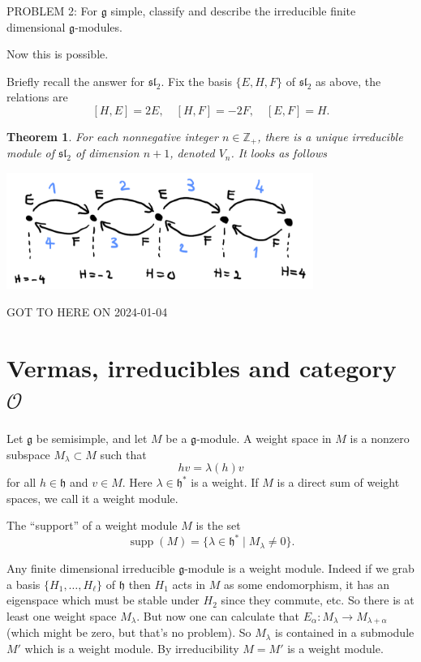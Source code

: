 \documentclass[12pt]{article}
\theoremstyle{plain}
\newtheorem{thm}{Theorem}[section]
\theoremstyle{definition}
\numberwithin{equation}{section}
\DeclareMathOperator{\supp}{supp}
\newcommand{\al}{\alpha}
\newcommand{\la}{\lambda}
\newcommand{\Z}{\mathbb{Z}}
\newcommand{\g}{\mathfrak{g}}
\newcommand{\h}{\mathfrak{h}}
\newcommand{\sll}{\mathfrak{sl}}
\newcommand{\OO}{\mathcal{O}}
\begin{document}
PROBLEM 2: For $\g$ simple, classify and describe the irreducible finite dimensional $\g$-modules.

Now this is possible.

Briefly recall the answer for $\sll_2$. Fix the basis $\{E, H, F\}$ of $\sll_2$ as above, the relations are
\[
[H, E] = 2E, \quad [H, F] = -2F, \quad [E, F] = H.
\]
\begin{thm}
For each nonnegative integer $n \in \Z_+$, there is a unique irreducible module of $\sll_2$ of dimension $n+1$, denoted $V_n$. It looks as follows
\begin{center}
\includegraphics[width=100mm]{sl2_chain_corrected.png}
\end{center}
\end{thm}

{\color{red}GOT TO HERE ON 2024-01-04}






\section{Vermas, irreducibles and category $\OO$}

Let $\g$ be semisimple, and let $M$ be a $\g$-module. A weight space in $M$ is a nonzero subspace $M_\la \subset M$ such that
\[
h v = \la(h) v
\]
for all $h \in \h$ and $v \in M$. Here $\la \in \h^*$ is a weight. If $M$ is a direct sum of weight spaces, we call it a weight module.

The ``support'' of a weight module $M$ is the set
\[
\supp(M) = \{\la \in \h^* \mid M_\la \neq 0\}.
\]


Any finite dimensional irreducible $\g$-module is a weight module. Indeed if we grab a basis $\{H_1, \ldots, H_\ell\}$ of $\h$ then $H_1$ acts in $M$ as some endomorphism, it has an eigenspace which must be stable under $H_2$ since they commute, etc. So there is at least one weight space $M_\la$. But now one can calculate that $E_\al : M_\la \rightarrow M_{\la+\al}$ (which might be zero, but that's no problem). So $M_\la$ is contained in a submodule $M'$ which is a weight module. By irreducibility $M = M'$ is a weight module.
\end{document}
